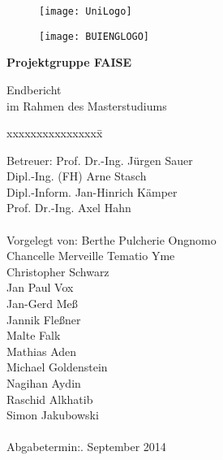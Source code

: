 \begin{titlepage}
  \begin{centering}
  \begin{figure}[h!]
    \centering
    \texttt{[image: UniLogo]}
  \end{figure}

  \vspace*{-0.8cm}

  \begin{figure}[h!]
    \centering
    \texttt{[image: BUIENGLOGO]}
  \end{figure}

  \vspace*{0.4cm}
  
  \textsf{\Huge \textbf{Projektgruppe FAISE\\}}

  \vspace*{0.5cm}
  \noindent Endbericht\\
  im Rahmen des Masterstudiums

  \end{centering}
  
  \vspace*{1.5cm}
  \begin{tabbing}
  xxxxxxxxxxxxxxxx\= \kill
  
  \small Betreuer: \>Prof. Dr.-Ing. Jürgen Sauer\\
  \small \>Dipl.-Ing. (FH) Arne Stasch\\
  \small \>Dipl.-Inform. Jan-Hinrich Kämper\\
  \small \>Prof. Dr.-Ing. Axel Hahn\\\\

  \small Vorgelegt von: \>Berthe Pulcherie Ongnomo\\
  \small \>Chancelle Merveille Tematio Yme\\
  \small \>Christopher Schwarz\\
  \small \>Jan Paul Vox\\
  \small \>Jan-Gerd Meß\\
  \small \>Jannik Fleßner\\
  \small \>Malte Falk\\
  \small \>Mathias Aden\\
  \small \>Michael Goldenstein\\
  \small \>Nagihan Aydin\\
  \small \>Raschid Alkhatib\\
  \small \>Simon Jakubowski\\\\

  \small Abgabetermin:. September 2014
  \end{tabbing}
\end{titlepage}